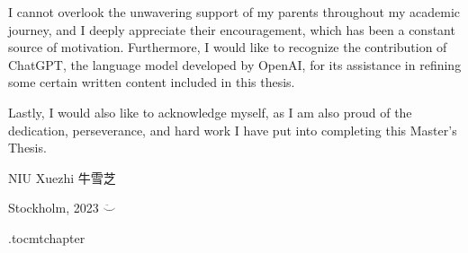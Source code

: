 I cannot overlook the unwavering support of my parents throughout my academic journey, and I deeply appreciate their encouragement, which has been a constant source of motivation. Furthermore, I would like to recognize the contribution of ChatGPT, the language model developed by OpenAI, for its assistance in refining some certain written content included in this thesis.

Lastly, I would also like to acknowledge myself, as I am also proud of the dedication, perseverance, and hard work I have put into completing this Master's Thesis.

\vspace{2cm}
\hfill NIU Xuezhi 牛雪芝

\hfill Stockholm, \monthname{ }2023 $\ddot\smile$

\newpage



\newpage

\etocdepthtag.toc{mtchapter}

\tableofcontents
\newpage